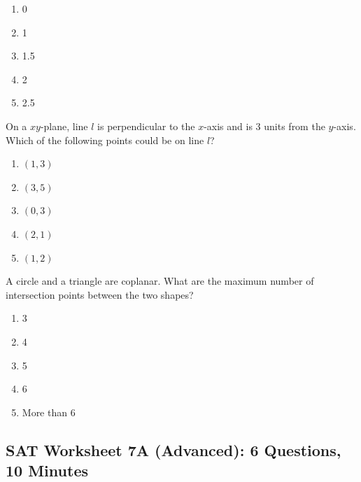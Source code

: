 \begin{multienumerate}
{\begin{enumerate}[label=(\Alph*)]
\item 0
\item 1
\item 1.5
\item 2
\item 2.5
\end{enumerate}
}{On a $xy$-plane, line $l$ is perpendicular to the $x$-axis and is 3 units from the $y$-axis. Which of the following points could be on line $l$?

\begin{enumerate}[label=(\Alph*)]
\item $(1,3)$
\item $(3,5)$
\item $(0,3)$
\item $(2,1)$
\item $(1,2)$
\end{enumerate}}

\vfill
{}
{A circle and a triangle are coplanar. What are the maximum number of intersection points between the two shapes?

\begin{enumerate}[label=(\Alph*)]
\item 3
\item 4
\item 5
\item 6
\item More than 6
\end{enumerate}}
\end{multienumerate}

\newpage
\subsection{SAT Worksheet 7A (Advanced): 6 Questions, 10 Minutes}

